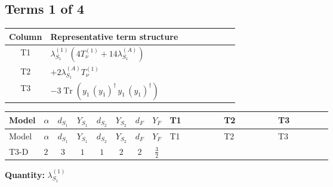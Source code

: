 \documentclass[8pt]{article}
\begin{document}
\begin{landscape}
\subsection*{Terms 1 of 4}
\begin{center}
\begin{tabular}{@{}c >{\raggedright\arraybackslash}p{0.82\linewidth}@{}}
\toprule
Column & Representative term structure \\
\midrule
T1 & \(\displaystyle {\lambda_{S_1}^{(1)}} (4 T_{\nu}^{(1)}+14 {\lambda_{S_1}^{(A)}})\) \\
\midrule
T2 & \(\displaystyle +2 {\lambda_{S_1}^{(A)}} T_{\nu}^{(1)}\) \\
\midrule
T3 & \(\displaystyle -3 \operatorname{Tr}\!\left({y_1}\,\left({y_1}\right)^{\dagger}\,{y_1}\,\left({y_1}\right)^{\dagger}\right)\) \\
\midrule
\bottomrule
\end{tabular}
\end{center}
\smallskip
\tiny
\begin{longtable}{@{}llcccccc >{\raggedright\arraybackslash}p{0.21\linewidth} >{\raggedright\arraybackslash}p{0.21\linewidth} >{\raggedright\arraybackslash}p{0.21\linewidth}@{}}
\toprule
Model & $\alpha$ & $d_{S_1}$ & $Y_{S_1}$ & $d_{S_2}$ & $Y_{S_2}$ & $d_F$ & $Y_F$ & T1 & T2 & T3 \\
\midrule
\endfirsthead
\toprule
Model & $\alpha$ & $d_{S_1}$ & $Y_{S_1}$ & $d_{S_2}$ & $Y_{S_2}$ & $d_F$ & $Y_F$ & T1 & T2 & T3 \\
\midrule
\endhead
T3-D & $2$ & $3$ & $1$ & $1$ & $2$ & $2$ & $\frac{3}{2}$ & \scriptsize\adjustbox{max width=\linewidth}{$\begin{gathered} {\lambda_{S_1}^{(1)}} (4 T_{\nu}^{(1)}+14 {\lambda_{S_1}^{(A)}})\end{gathered}$} & \scriptsize\adjustbox{max width=\linewidth}{$\begin{gathered} +2 {\lambda_{S_1}^{(A)}} T_{\nu}^{(1)}\end{gathered}$} & \scriptsize\adjustbox{max width=\linewidth}{$\begin{gathered} -3 \operatorname{Tr}\!\left({y_1}\,\left({y_1}\right)^{\dagger}\,{y_1}\,\left({y_1}\right)^{\dagger}\right)\end{gathered}$} \\
\midrule
\bottomrule
\end{longtable}
\clearpage
\noindent\textbf{Quantity: }$\lambda_{S_1}^{(1)}$\par\smallskip

\end{landscape}
\end{document}
